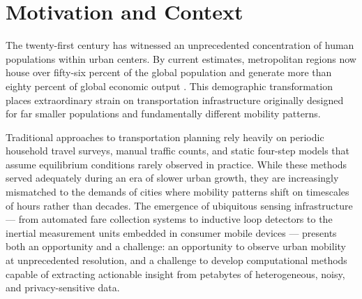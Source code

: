 \section{Motivation and Context}

The twenty-first century has witnessed an unprecedented concentration of human populations within urban centers. By current estimates, metropolitan regions now house over fifty-six percent of the global population and generate more than eighty percent of global economic output \cite{chen2023urban}. This demographic transformation places extraordinary strain on transportation infrastructure originally designed for far smaller populations and fundamentally different mobility patterns.

Traditional approaches to transportation planning rely heavily on periodic household travel surveys, manual traffic counts, and static four-step models that assume equilibrium conditions rarely observed in practice. While these methods served adequately during an era of slower urban growth, they are increasingly mismatched to the demands of cities where mobility patterns shift on timescales of hours rather than decades. The emergence of ubiquitous sensing infrastructure --- from automated fare collection systems to inductive loop detectors to the inertial measurement units embedded in consumer mobile devices --- presents both an opportunity and a challenge: an opportunity to observe urban mobility at unprecedented resolution, and a challenge to develop computational methods capable of extracting actionable insight from petabytes of heterogeneous, noisy, and privacy-sensitive data.
